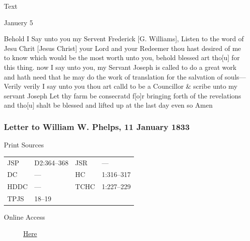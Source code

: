			\begin{description}
				\item[Text]
			\end{description}
				
				\begin{tightcenter}
				Januery 5
				\end{tightcenter}
				
				Behold I Say unto you my Servent Frederick [G. Williams], Listen to the word of Jesu Chrit [Jesus Christ] your Lord and your Redeemer thou hast desired of me to know which would be the most worth unto you, behold blessed art tho[u] for this thing. now I say unto you, my Servant Joseph is called to do a great work and hath need that he may do the work of translation for the salvation of souls--- Verily verily I say unto you thou art calld to be a Councillor \& scribe unto my servant Joseph Let thy farm be consecratd f[o]r bringing forth of the revelations and tho[u] shalt be blessed and lifted up at the last day even so Amen
				
		\subsubsection{Letter to William W. Phelps, 11 January 1833}
			\label{EMS-1833-JS-11-JAN-1833}
		
			\begin{description}
				\item[Print Sources]
			\end{description}

				\begin{tabular}{p{0.5in}p{1in}p{0.5in}p{1in}}
				JSP	 	& D2:364--368		& JSR 		& --- \\
				DC	 	& --- 				& HC 		& 1:316--317 \\
				HDDC 	& ---				& TCHC 		& 1:227--229 \\
				TPJS 	& 18--19			& 	 		&  \\
				\end{tabular}
			
			\begin{description}
				\item[Online Access] \href{https://www.josephsmithpapers.org/paper-summary/letter-to-william-w-phelps-11-january-1833/1}{Here}
			\end{description}
			
